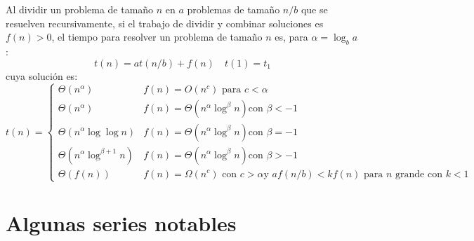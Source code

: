 \documentclass[english, spanish, fleqn]{article}
\begin{document}
  Al dividir un problema de tamaño \(n\)
  en \(a\) problemas de tamaño \(n / b\)
  que se resuelven recursivamente,
  si el trabajo de dividir y combinar soluciones es \(f(n) > 0\),
  el tiempo para resolver un problema de tamaño \(n\) es,
  para \(\alpha = \log_b a\):
  \begin{equation*}
    t(n)
      = a t(n / b) + f(n)
    \quad t(1) = t_1
  \end{equation*}
  cuya solución es:
  \begin{equation*}
    t(n)
      = \begin{cases}
          \Theta(n^\alpha)
             & \text{\(f(n) = O(n^c)\) para \(c < \alpha\)} \\
          \Theta(n^\alpha)
             & \text{\(f(n) = \Theta(n^\alpha \log^\beta n)\)
                     con \(\beta < -1\)} \\
          \Theta(n^\alpha \log \log n)
             & \text{\(f(n) = \Theta(n^\alpha \log^\beta n)\)
                     con \(\beta = -1\)} \\
          \Theta(n^\alpha \log^{\beta + 1} n)
             & \text{\(f(n) = \Theta(n^\alpha \log^\beta n)\)
                     con \(\beta > -1\)} \\
          \Theta(f(n))
            & \text{\(f(n) = \Omega(n^c)\) con \(c > \alpha\)
                    y \(a f(n / b) < k f(n)\) para \(n\) grande
                    con \(k < 1\)}
        \end{cases}
  \end{equation*}

\section*{Algunas series notables}
\label{sec:series}
\end{document}
